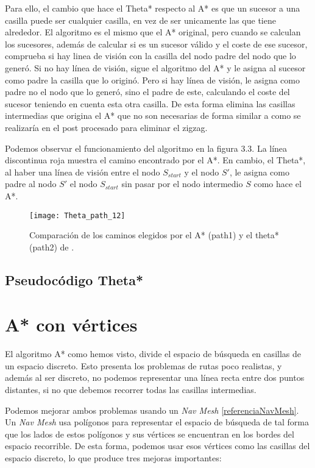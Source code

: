 Para ello, el cambio que hace el Theta* respecto al A* es que un sucesor a una casilla puede ser cualquier casilla, en vez de ser unicamente las que tiene alrededor. El algoritmo es el mismo que el A* original, pero cuando se calculan los sucesores, además de calcular si es un sucesor válido y el coste de ese sucesor, comprueba si hay linea de visión con la casilla del nodo padre del nodo que lo generó. Si no hay línea de visión, sigue el algoritmo del A* y le asigna al sucesor como padre la casilla que lo originó. Pero si hay línea de visión, le asigna como padre no el nodo que lo generó, sino el padre de este, calculando el coste del sucesor teniendo en cuenta esta otra casilla. De esta forma elimina las casillas intermedias que origina el A* que no son necesarias de forma similar a como se realizaría en el post procesado para eliminar el zigzag.

Podemos observar el funcionamiento del algoritmo en la figura 3.3. La línea discontinua roja muestra el camino encontrado por el A*. En cambio, el Theta*, al haber una línea de visión entre el nodo $S_{start}$ y el nodo $S'$, le asigna como padre al nodo $S'$ el nodo $S_{start}$ sin pasar por el nodo intermedio $S$ como hace el A*.

\begin{figure}[htpb]
    \centering
    \texttt{[image: Theta\_path\_12]}
    \caption[Comparación de los caminos elegidos por el A* y el Theta*]{Comparación de los caminos elegidos por el A* (path1) y el theta* (path2) de \cite{thetaestrellawebimagen}.}
    \label{fig:basics AFM sketch}
\end{figure}

\subsection{Pseudocódigo Theta*}

\newpage

\section{A* con vértices}
El algoritmo A* como hemos visto, divide el espacio de búsqueda en casillas de un espacio discreto. Esto presenta los problemas de rutas poco realistas, y además al ser discreto, no podemos representar una línea recta entre dos puntos distantes, si no que debemos recorrer todas las casillas intermedias.

Podemos mejorar ambos problemas usando un \textit{Nav Mesh} \ref{referenciaNavMesh}.  Un \textit{Nav Mesh} usa polígonos para representar el espacio de búsqueda de tal forma que los lados de estos polígonos y sus vértices se encuentran en los bordes del espacio recorrible. De esta forma, podemos usar esos vértices como las casillas del espacio discreto, lo que produce tres mejoras importantes:

